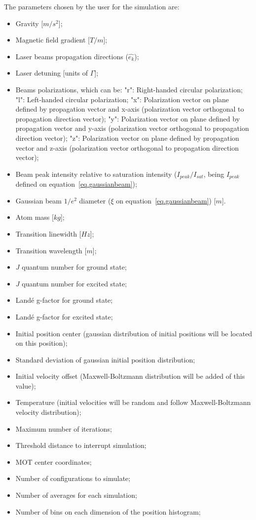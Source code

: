 \documentclass[12pt,a4paper,twoside]{article}
\begin{document}
The parameters chosen by the user for the simulation are:

\begin{itemize}
	\item Gravity [$m/s^2$];
	\item Magnetic field gradient [$T/m$];
	\item Laser beams propagation directions ($\hat{e_k}$);
	\item Laser detuning [units of $\Gamma$];
	\item Beams polarizations, which can be:
		\subitem "r": Right-handed circular polarization;
		\subitem "l": Left-handed circular polarization;
		\subitem "x": Polarization vector on plane defined by propagation vector and x-axis (polarization vector orthogonal to propagation direction vector);
		\subitem "y": Polarization vector on plane defined by propagation vector and y-axis (polarization vector orthogonal to propagation direction vector);
		\subitem "z": Polarization vector on plane defined by propagation vector and z-axis (polarization vector orthogonal to propagation direction vector);
	\item Beam peak intensity relative to saturation intensity ($I_{peak}/I_{sat}$, being $I_{peak}$ defined on equation~\ref{eq.gaussianbeam});
	\item Gaussian beam $1/e^2$ diameter ($\xi$ on equation~\ref{eq.gaussianbeam}) [$m$].
	\vspace{5 mm}
	\item Atom mass [$kg$];
	\item Transition linewidth [$Hz$];
	\item Transition wavelength [$m$];
	\item $J$ quantum number for ground state;
	\item $J$ quantum number for excited state;
	\item Landé g-factor for ground state;
	\item Landé g-factor for excited state;
	\vspace{5 mm}
	\item Initial position center (gaussian distribution of initial positions will be located on this position);
	\item Standard deviation of gaussian initial position distribution;
	\item Initial velocity offset (Maxwell-Boltzmann distribution will be added of this value);
	\item Temperature (initial velocities will be random and follow Maxwell-Boltzmann velocity distribution);
	\vspace{5 mm}
	\item Maximum number of iterations;
	\item Threshold distance to interrupt simulation;
	\item MOT center coordinates;
	\item Number of configurations to simulate;
	\item Number of averages for each simulation;
	\item Number of bins on each dimension of the position histogram;
\end{itemize}
\end{document}
